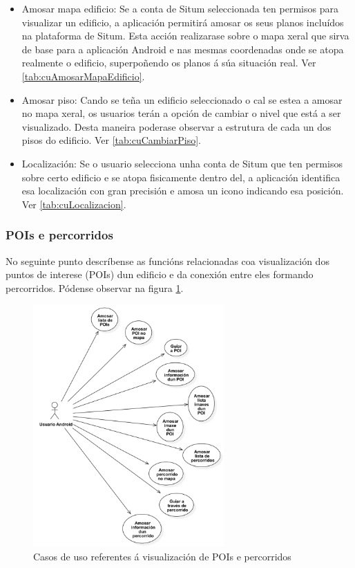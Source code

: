 \begin{itemize}
	\item Amosar mapa edificio: Se a conta de Situm seleccionada ten permisos para visualizar un edificio, a aplicación permitirá amosar os seus planos incluídos na plataforma de Situm. Esta acción realizarase sobre o mapa xeral que sirva de base para a aplicación Android e nas mesmas coordenadas onde se atopa realmente o edificio, superpoñendo os planos á súa situación real. Ver \ref{tab:cuAmosarMapaEdificio}.
	\item Amosar piso: Cando se teña un edificio seleccionado o cal se estea a amosar no mapa xeral, os usuarios terán a opción de cambiar o nivel que está a ser visualizado. Desta maneira poderase observar a estrutura de cada un dos pisos do edificio. Ver \ref{tab:cuCambiarPiso}.
	\item Localización: Se o usuario selecciona unha conta de Situm que ten permisos sobre certo edificio e se atopa fisicamente dentro del, a aplicación identifica esa localización con gran precisión e amosa un icono indicando esa posición. Ver \ref{tab:cuLocalizacion}.
\end{itemize}


\subsubsection{POIs e percorridos}
No seguinte punto descríbense as funcións relacionadas coa visualización dos puntos de interese (POIs) dun edificio e da conexión entre eles formando percorridos. Pódense observar na figura \ref{fig:cuUsuarioAndroidPrincipalPOIPercorrido}.

\begin{figure}[tbp]
	\begin{center}
		\includegraphics[width=0.65\textwidth]{figures/CasosUso/UsuarioAndroidPOIPercorrido}
		\caption{Casos de uso referentes á visualización de POIs e percorridos}
		\label{fig:cuUsuarioAndroidPrincipalPOIPercorrido}
	\end{center}
\end{figure}

